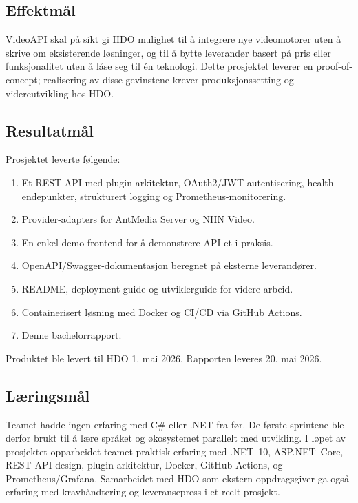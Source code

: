 \subsection{Effektmål}

VideoAPI skal på sikt gi HDO mulighet til å integrere nye 
videomotorer uten å skrive om eksisterende løsninger, og til å 
bytte leverandør basert på pris eller funksjonalitet uten å låse 
seg til én teknologi. Dette prosjektet leverer en 
proof-of-concept; realisering av disse gevinstene krever 
produksjonssetting og videreutvikling hos HDO.

\subsection{Resultatmål}

Prosjektet leverte følgende:

\begin{enumerate}
    \item Et REST API med plugin-arkitektur, OAuth2/JWT-autentisering, 
          health-endepunkter, strukturert logging og Prometheus-monitorering.
    \item Provider-adapters for AntMedia Server og NHN Video.
    \item En enkel demo-frontend for å demonstrere API-et i praksis.
    \item OpenAPI/Swagger-dokumentasjon beregnet på eksterne leverandører.
    \item README, deployment-guide og utviklerguide for videre arbeid.
    \item Containerisert løsning med Docker og CI/CD via GitHub Actions.
    \item Denne bachelorrapport.
\end{enumerate}

Produktet ble levert til HDO 1. mai 2026. Rapporten leveres 
20. mai 2026.

\subsection{Læringsmål}

Teamet hadde ingen erfaring med C\# eller .NET fra før. 
De første sprintene ble derfor brukt til å lære språket og 
økosystemet parallelt med utvikling. I løpet av prosjektet 
opparbeidet teamet praktisk erfaring med .NET~10, ASP.NET~Core, 
REST API-design, plugin-arkitektur, Docker, GitHub Actions, 
og Prometheus/Grafana. Samarbeidet med HDO som ekstern 
oppdragsgiver ga også erfaring med kravhåndtering og 
leveransepress i et reelt prosjekt.